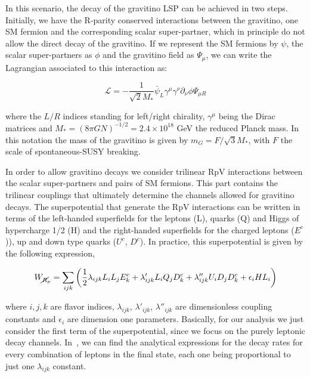 \documentclass[a4paper,11pt]{article}
\begin{document}
In this scenario, the decay of the gravitino LSP can be achieved in two steps. Initially, we have the R-parity conserved interactions between the gravitino, one SM fermion and the corresponding scalar super-partner, which in principle do not allow the direct decay of the gravitino. If we represent the SM fermions by $\psi$, the scalar super-partners as $\phi$ and the gravitino field as $\Psi_\mu$, we can write the Lagrangian associated to this interaction as:

\begin{equation}
  \mathcal{L} = −\frac{1}{\sqrt{2}M_*}\bar{\psi}_L\gamma^\mu\gamma^\nu\partial_\nu\phi\Psi_{\mu R}
\end{equation}

\noindent where the $L/R$ indices standing for left/right chirality, $\gamma^\mu$ being the Dirac matrices and $M_* = (8\pi G N)^{-1/2} = 2.4\times 10^{18}$ GeV the reduced Planck mass. In this notation the mass of the gravitino is given by $m_G = F/\sqrt{3}M_*$, with $F$ the scale of spontaneous-SUSY breaking.

In order to allow gravitino decays we consider trilinear RpV interactions between the scalar super-partners and pairs of SM fermions. This part contains the trilinear couplings that ultimately determine the channels allowed for gravitino decays. The superpotential that generate the RpV interactions can be written in terms of the left-handed superfields for the leptons (L), quarks (Q) and Higgs of hypercharge 1/2 (H) and the right-handed superfields for the charged leptons ($E^c$)), up and down type quarks ($U^c$, $D^c$). In practice, this superpotential is given by the following expression,

\begin{equation}
 W_{\cancel{R}_p} = \sum_{ijk}\left(\frac{1}{2}\lambda_{ijk}L_i L_j E_k^c + \lambda'_{ijk}L_i Q_j D_k^c + \lambda''_{ijk}U_i D_j D_k^c + \epsilon_iHL_i\right)
\end{equation}

\noindent where $i,j,k$ are flavor indices, $\lambda_{ijk}$, $\lambda'_{ijk}$, $\lambda''_{ijk}$ are dimensionless coupling constants and $\epsilon_i$ are dimension one parameters. Basically, for our analysis we just consider the first term of the superpotential, since we focus on the purely leptonic decay channels. In~\cite{Moreau:2001sr}, we can find the analytical expressions for the decay rates for every combination of leptons in the final state, each one being proportional to just one $\lambda_{ijk}$ constant. 
\end{document}
